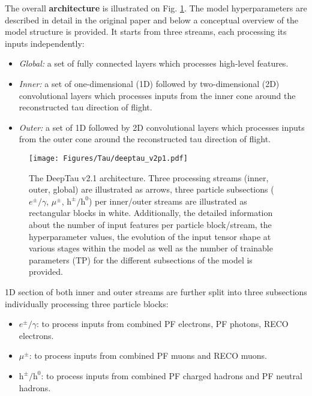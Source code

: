 The overall \textbf{architecture} is illustrated on Fig. \ref{fig:deeptau_v2p1_arch}. The model hyperparameters are described in detail in the original paper and below a conceptual overview of the model structure is provided. It starts from three streams, each processing its inputs independently: 
\begin{itemize}
    \item \textit{Global:} a set of fully connected layers which processes high-level features.
    \item \textit{Inner:} a set of one-dimensional (1D) followed by two-dimensional (2D) convolutional layers which processes inputs from the inner cone around the reconstructed tau direction of flight.
    \item \textit{Outer:} a set of 1D followed by 2D convolutional layers which processes inputs from the outer cone around the reconstructed tau direction of flight.
\end{itemize}

\begin{figure}[ht!]
    \centering
    \texttt{[image: Figures/Tau/deeptau\_v2p1.pdf]}
    \caption{The DeepTau v2.1 architecture. Three processing streams (inner, outer, global) are illustrated as arrows, three particle subsections ($e^\pm/\gamma$, $\mu^\pm$, $\text{h}^\pm/\text{h}^0$) per inner/outer streams are illustrated as rectangular blocks in white. Additionally, the detailed information about the number of input features per particle block/stream, the hyperparameter values, the evolution of the input tensor shape at various stages within the model as well as the number of trainable parameters (TP) for the different subsections of the model is provided.}
    \label{fig:deeptau_v2p1_arch}
\end{figure}
1D section of both inner and outer streams are further split into three subsections individually processing three particle blocks: 
\begin{itemize}
    \item $e^\pm/\gamma$: to process inputs from combined PF electrons, PF photons, RECO electrons.
    \item $\mu^\pm$: to process inputs from combined PF muons and RECO muons.
    \item $\text{h}^\pm/\text{h}^0$: to process inputs from combined PF charged hadrons and PF neutral hadrons.
\end{itemize}


